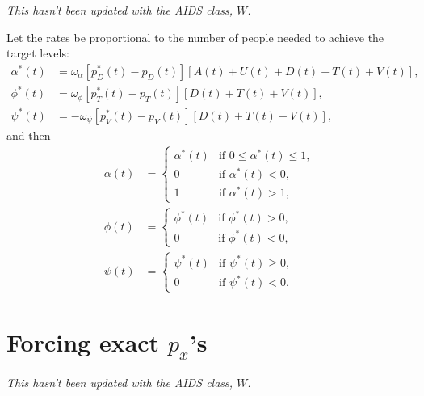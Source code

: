 \documentclass{article}
\begin{document}
\textit{This hasn't been updated with the AIDS class, $W$.}

Let the rates be proportional to the number of people needed to
achieve the target levels:
\begin{equation}
  \begin{split}
    \alpha^*(t) &= \omega_{\alpha}
    [p_D^*(t) - p_D(t)]
    [A(t) + U(t) + D(t) + T(t) + V(t)],
    \\
    \phi^*(t) &= \omega_{\phi}
    [p_T^*(t) - p_T(t)]
    [D(t) + T(t) + V(t)],
    \\
    \psi^*(t) &= - \omega_{\psi}
    [p_V^*(t) - p_V(t)]
    [D(t) + T(t) + V(t)],
  \end{split}
\end{equation}
and then
\begin{equation}
  \begin{split}
    \alpha(t) &=
    \begin{cases}
      \alpha^*(t) & \text{if $0 \leq \alpha^*(t) \leq 1$},
      \\
      0 & \text{if $\alpha^*(t) < 0$},
      \\
      1 & \text{if $\alpha^*(t) > 1$},
    \end{cases}
    \\
    \phi(t) &=
    \begin{cases}
      \phi^*(t) & \text{if $\phi^*(t) > 0$},
      \\
      0 & \text{if $\phi^*(t) < 0$},
    \end{cases}
    \\
    \psi(t) &=
    \begin{cases}
      \psi^*(t) & \text{if $\psi^*(t) \geq 0$},
      \\
      0 & \text{if $\psi^*(t) < 0$}.
    \end{cases}
  \end{split}
\end{equation}


\section{Forcing exact $p_x$'s}

\textit{This hasn't been updated with the AIDS class, $W$.}
\end{document}
